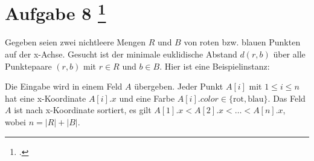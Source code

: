 \documentclass{lehramt-informatik-aufgabe}
\begin{document}
\def\blauesZeichen{\bullet}
\def\rotesZeichen{x}
\def\b#1{\node at (#1,0){\blauesZeichen};}
\def\r#1{\node at (#1,0){\rotesZeichen};}


\section{Aufgabe 8
\footcite{examen:66115:2020:03}}

Gegeben seien zwei nichtleere Mengen $R$ und $B$ von roten bzw. blauen
Punkten auf der x-Achse. Gesucht ist der minimale euklidische Abstand
$d(r, b)$ über alle Punktepaare $(r,b)$ mit $r \in R$ und $b \in B$.
Hier ist eine Beispielinstanz:

\begin{center}
\end{center}

\noindent
Die Eingabe wird in einem Feld $A$ übergeben. Jeder Punkt $A[i]$ mit $1
\leq i \leq n$ hat eine x-Koordinate $A[i].x$ und eine Farbe $A[i].color
\in \{ \text{rot}, \text{blau} \}$. Das Feld $A$ ist nach x-Koordinate
sortiert, \dh es gilt $A[1].x < A[2].x < \dots < A[n].x$, wobei $n = |R|
+ |B|$.
\end{document}

